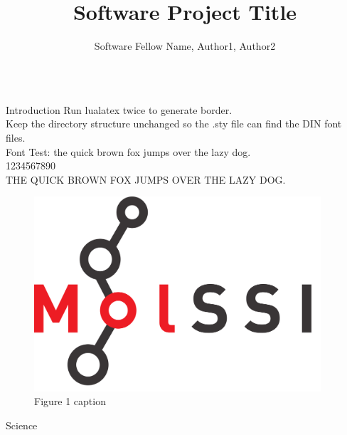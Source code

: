 \documentclass{beamer}
\title{Software Project Title}
\author{Software Fellow Name, Author1, Author2}
\institute{Author Affiliations}
\begin{document}
  \rmfamily


  \begin{frame}
    \vfill

    \begin{columns}[t]

      \begin{column}{.417\linewidth}

        \begin{section}{Introduction}
          Run lualatex twice to generate border.\\
          Keep the directory structure unchanged so the .sty file can find the DIN font files.\\
          Font Test: the quick brown fox jumps over the lazy dog.\\
          1234567890\\
          THE QUICK BROWN FOX JUMPS OVER THE LAZY DOG.\\
          
          \bigskip
          \bigskip
          \lipsum[1-2]

          \begin{figure}[h]
            \includegraphics[width=0.80\linewidth]{./images/molssi_main_logo.png}
            \caption{Figure 1 caption}
          \end{figure}
        \end{section}

        \begin{section}{Science}
          \lipsum[1]
        \end{section}

      \end{column}

      \begin{column}{.417\linewidth}


\end{column}
\end{columns}
\end{frame}
\end{document}
